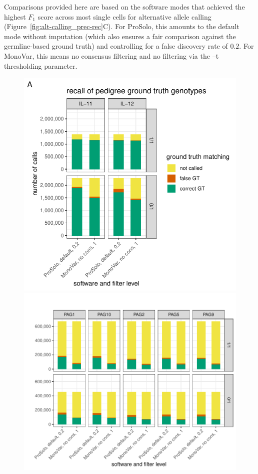 \documentclass[authoryear,preprint,11pt]{scrartcl}
\begin{document}
Comparisons provided here are based on the software modes that achieved the highest $F_1$ score across most single cells for alternative allele calling (Figure~\ref{fig:alt-calling_prec-rec}C).
For ProSolo, this amounts to the default mode without imputation (which also ensures a fair comparison against the germline-based ground truth) and controlling for a false discovery rate of $0.2$.
For MonoVar, this means no consensus filtering and no filtering via the {\ttfamily --t} thresholding parameter.\\

\begin{figure}[!tpb]
 \begin{minipage}{.45\linewidth}
  \includegraphics[width=\linewidth]{figs/Dong2017/Dong2017_genotyping_recall_prosolo_monovar.pdf}
  \end{minipage}
 \begin{minipage}{.53\linewidth}
  \includegraphics[width=\linewidth]{figs/Laehnemann2017/Laehnemann2017_genotyping_recall_prosolo_monovar.pdf}

\end{minipage}
\end{figure}
\end{document}
